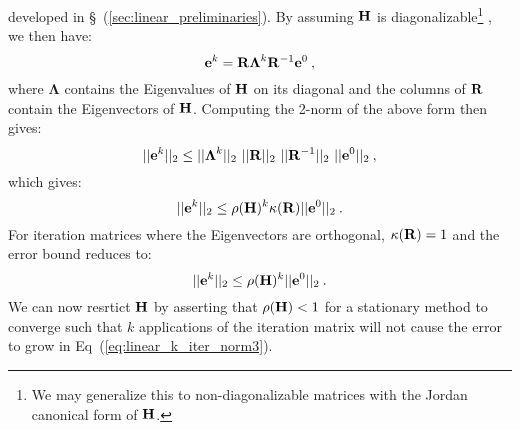 developed in \S~(\ref{sec:linear_preliminaries}). By assuming $\mathbf{H}$
is diagonalizable\footnote{We may generalize this to
  non-diagonalizable matrices with the Jordan canonical form of
  $\mathbf{H}$.} \citep{saad_2003}, we then have:
\begin{equation}
  \mathbf{e}^{k} =
  \mathbf{R}\boldsymbol{\Lambda}^k\mathbf{R}^{-1}\mathbf{e}^0\:,
  \label{eq:linear_k_iter_error_diag}
\end{equation}
where $\boldsymbol{\Lambda}$ contains the Eigenvalues of $\mathbf{H}$ on
its diagonal and the columns of $\mathbf{R}$ contain the Eigenvectors of
$\mathbf{H}$. Computing the 2-norm of the above form then gives:
\begin{equation}
  ||\ve{e}^{k}||_2 \leq ||\boldsymbol{\Lambda}^k||_2\ 
  ||\ve{R}||_2\ ||\ve{R}^{-1}||_2\ ||\ve{e}^0||_2\:,
  \label{eq:linear_k_iter_norm1}
\end{equation}
which gives:
\begin{equation}
  ||\mathbf{e}^{k}||_2 \leq \rho(\mathbf{H})^k \kappa(\mathbf{R})
  ||\mathbf{e}^0||_2\:.
  \label{eq:linear_k_iter_norm2}
\end{equation}
For iteration matrices where the Eigenvectors are orthogonal,
$\kappa(\mathbf{R})=1$ and the error bound reduces to:
\begin{equation}
  ||\mathbf{e}^{k}||_2 \leq \rho(\mathbf{H})^k
  ||\mathbf{e}^0||_2\:.
  \label{eq:linear_k_iter_norm3}
\end{equation}
We can now resrtict $\mathbf{H}$ by asserting that $\rho(\mathbf{H}) < 1$
for a stationary method to converge such that $k$ applications of the
iteration matrix will not cause the error to grow in
Eq~(\ref{eq:linear_k_iter_norm3}). 

